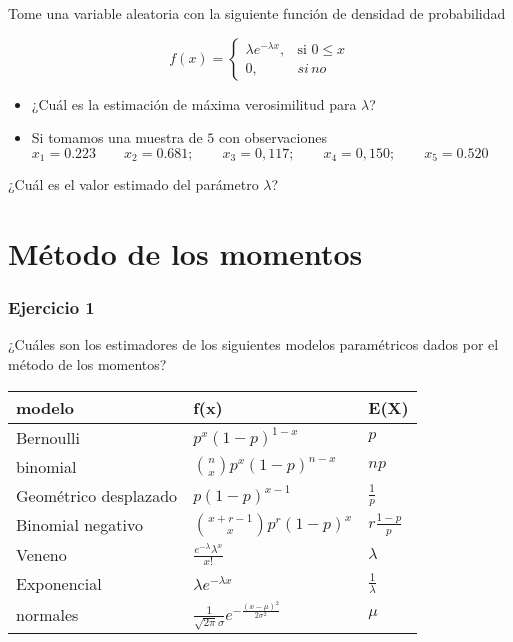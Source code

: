 \documentclass[
]{book}
\begin{document}
Tome una variable aleatoria con la siguiente función de densidad de probabilidad

\[
    f(x)= 
\begin{cases}
    \lambda e^{-\lambda x},& \text{si } 0 \leq x\\
    0,& si \, no 
\end{cases}
\]

\begin{itemize}
\item
  ¿Cuál es la estimación de máxima verosimilitud para \(\lambda\)?
\item
  Si tomamos una muestra de \(5\) con observaciones
  \(x_1 = 0.223 \qquad x_2 = 0.681; \qquad x_3 = 0,117; \qquad x_4 = 0,150; \qquad x_5 = 0.520\)
\end{itemize}

¿Cuál es el valor estimado del parámetro \(\lambda\)?

\hypertarget{muxe9todo-de-los-momentos}{%
\section{Método de los momentos}\label{muxe9todo-de-los-momentos}}

\hypertarget{ejercicio-1-8}{%
\subsubsection{Ejercicio 1}\label{ejercicio-1-8}}

¿Cuáles son los estimadores de los siguientes modelos paramétricos dados por el método de los momentos?

\begin{longtable}[]{@{}lll@{}}
\toprule
modelo & f(x) & E(X) \\
\midrule
\endhead
Bernoulli & \(p^x(1-p)^{1-x}\) & \(p\) \\
binomial & \(\binom n x p^x(1-p)^{n-x}\) & \(np\) \\
Geométrico desplazado & \(p(1-p)^{x-1}\) & \(\frac{1}{p}\) \\
Binomial negativo & \(\binom {x+r-1} x p^r(1-p)^x\) & \(r\frac{1-p}{p}\) \\
Veneno & \(\frac{e^{-\lambda}\lambda^x}{x!}\) & \(\lambda\) \\
Exponencial & \(\lambda e^{-\lambda x}\) & \(\frac{1}{\lambda}\) \\
normales & \(\frac{1}{\sqrt{2\pi}\sigma}e^{-\frac{(x-\mu)^2}{2\sigma^2}}\) & \(\mu\) \\
\bottomrule
\end{longtable}
\end{document}
